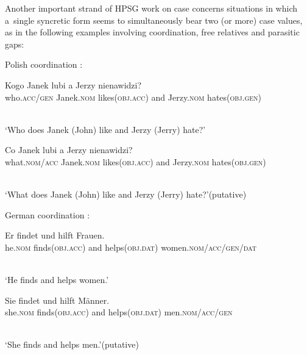 \documentclass[output=paper]{langsci/langscibook}
\begin{document}
Another important strand of HPSG work on case concerns situations in which a~single syncretic form seems to simultaneously bear two (or more) case values, as in the following examples involving coordination, free relatives and parasitic gaps:
\begin{examples}
\item\label{ex:syn:pc} Polish coordination \citep[701–702]{Dyla84}:
  \begin{examples}
  \item 
    \begin{gloss}
      Kogo Janek lubi a Jerzy nienawidzi? \\
      who.\textsc{acc/gen} Janek.\textsc{nom} likes(\textsc{obj.acc}) and Jerzy.\textsc{nom} hates(\textsc{obj.gen})
    \end{gloss}\\[\glosslen]
    ‘Who does Janek (John) like and Jerzy (Jerry) hate?’
  \item 
    \begin{gloss}
      \prep{*}Co Janek lubi a Jerzy nienawidzi? \\
      what.\textsc{nom/acc} Janek.\textsc{nom} likes(\textsc{obj.acc}) and Jerzy.\textsc{nom} hates(\textsc{obj.gen})
    \end{gloss}\\[\glosslen]
    ‘What does Janek (John) like and Jerzy (Jerry) hate?’\hfill(putative)
  \end{examples}
\item\label{ex:syn:gc} German coordination \citep[764–765]{PZ86}:
  \begin{examples}
  \item
    \begin{gloss}
      Er findet und hilft Frauen. \\
      he.\textsc{nom} finds(\textsc{obj.acc}) and helps(\textsc{obj.dat}) women.\textsc{nom/acc/gen/dat}
    \end{gloss}\\[\glosslen]
    ‘He finds and helps women.’
  \item
    \begin{gloss}
      \prep{*}Sie findet und hilft Männer. \\
      she.\textsc{nom} finds(\textsc{obj.acc}) and helps(\textsc{obj.dat}) men.\textsc{nom/acc/gen}
    \end{gloss}\\[\glosslen]
    ‘She finds and helps men.’\hfill(putative)
  \item
    \begin{gloss}

\end{gloss}
\end{examples}
\end{examples}
\end{document}

